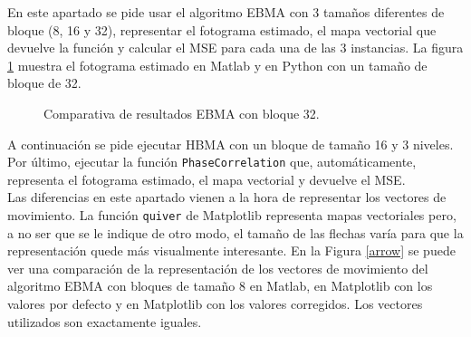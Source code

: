 En este apartado se pide usar el algoritmo EBMA con 3 tamaños diferentes de bloque (8, 16 y 32), representar el fotograma estimado, el mapa vectorial que devuelve la función y calcular el MSE para cada una de las 3 instancias. La figura \ref{ebma32} muestra el fotograma estimado en Matlab y en Python con un tamaño de bloque de 32.\\

\begin{figure}[!tbp]
  \centering
  \hfill
  \caption{Comparativa de resultados EBMA con bloque 32.}
  \label{ebma32}
\end{figure}
A continuación se pide ejecutar HBMA con un bloque de tamaño 16 y 3 niveles.\\

Por último, ejecutar la función \texttt{PhaseCorrelation} que, automáticamente, representa el fotograma estimado, el mapa vectorial y devuelve el MSE.\\

Las diferencias en este apartado vienen a la hora de representar los vectores de movimiento. La función \texttt{quiver} de Matplotlib representa mapas vectoriales pero, a no ser que se le indique de otro modo, el tamaño de las flechas varía para que la representación quede más visualmente interesante. En la Figura \ref{arrow} se puede ver una comparación de la representación  de los vectores de movimiento del algoritmo EBMA con bloques de tamaño 8 en Matlab, en Matplotlib con los valores por defecto y en Matplotlib con los valores corregidos. Los vectores utilizados son exactamente iguales.\\

